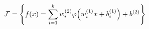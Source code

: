 \documentclass[preview]{standalone}
\begin{document}
\begin{align*}
\special{dvisvgm:raw <g id='unique000'>}\mathcal{F}=\left\{f(x)=\sum_{i=1}^{k}w_i^{(2)}\varphi\!\left(w_i^{(1)}x+b_i^{(1)}\right)+b^{(2)}\right\}\special{dvisvgm:raw </g>}
\end{align*}
\end{document}
